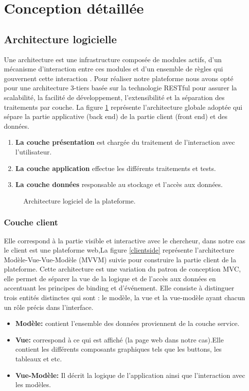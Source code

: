 \section{Conception détaillée}
\subsection{Architecture logicielle } 
Une architecture est une infrastructure composée de modules actifs,
d’un mécanisme d’interaction entre ces modules et d’un ensemble de
règles qui gouvernent cette interaction \cite{boasson1995artistry}.
Pour réaliser notre plateforme nous avons opté pour une architecture 3-tiers basée sur la technologie RESTful pour assurer la scalabilité, la facilité de développement, l'extensibilité et la séparation des traitements par couche. La figure \ref{globalarchi} représente  l’architecture globale adoptée qui sépare la partie applicative (back end) de la partie client (front end) et des données.
\begin{enumerate}
	\item \textbf{La couche présentation} est chargée du traitement de l'interaction avec l'utilisateur. 
	
	\item \textbf{La couche application} effectue les différents traitements et tests.
	\item \textbf{La couche données} responsable au stockage et l’accès aux  données.
	
\end{enumerate}
\begin{figure}[H]
	\centering
	\caption{Architecture logiciel de la plateforme.}
	\label{globalarchi}
\end{figure}





\subsubsection{Couche client}
Elle correspond à la partie visible et interactive avec le chercheur, dans notre cas le client est une plateforme web,La figure \ref{clientside} représente l'architecture Modèle-Vue-Vue-Modèle (MVVM) suivie pour construire la partie client de la plateforme. Cette architecture est une variation du patron de conception MVC, elle permet de séparer la vue de la logique et de l'accès aux données en accentuant les principes de binding et d’événement. Elle consiste à distinguer trois entités distinctes qui sont : le modèle, la vue et la vue-modèle ayant chacun un rôle précis dans l’interface.
\begin{itemize}
	\item	\textbf{Modèle:} contient l’ensemble des données proviennent  de la couche service.  
	\item	\textbf{Vue:} correspond à ce qui est affiché (la page web dans notre cas).Elle contient les différents composants graphiques tels que les buttons, les tableaux et etc. 
	\item	\textbf{Vue-Modèle:} Il décrit la logique de l’application ainsi que l’interaction avec les modèles.
\end{itemize}


